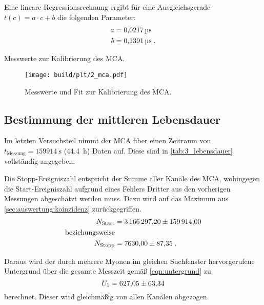Eine lineare Regressionsrechnung ergibt
für eine Ausgleichsgerade $t(c) = a \cdot c + b$
die folgenden Parameter:
\begin{align*}
    a &=\SI{0.0217 \pm 0}{\micro\second} \\
    b &=\SI{0.1391 \pm 0}{\micro\second} \; .
\end{align*}

\begin{table}
    \centering
    \caption{Messwerte zur Kalibrierung des \ac{MCA}.}
    \label{tab:2_mca}
\end{table}

\begin{figure}
    \centering
    \texttt{[image: build/plt/2\_mca.pdf]}
    \caption{Messwerte und Fit zur Kalibrierung des \ac{MCA}.}
    \label{fig:plt:2_mca}
\end{figure}


\FloatBarrier
\subsection{Bestimmung der mittleren Lebensdauer} \label{sec:auswertung:lebensdauer}
Im letzten Versuchsteil nimmt der \ac{MCA} über einen Zeitraum von $t_\text{Messung} = \SI{159914}{\second}$ (\SI{44.4}{\hour}) Daten auf.
Diese sind in \autoref{tab:3_lebensdauer} vollständig angegeben.


Die Stopp-Ereigniszahl entspricht der Summe aller Kanäle des \ac{MCA},
wohingegen die Start-Ereigniszahl aufgrund eines Fehlers Dritter aus den vorherigen Messungen abgeschätzt werden muss.
Dazu wird auf das Maximum aus \autoref{sec:auswertung:koinzidenz} zurückgegriffen.
\begin{align*}
    N_\text{Start} &= \num{3166297.20 \pm 159914.00} \\
    \text{beziehungsweise} \\
    N_\text{Stopp} &= \num{7630.00 \pm 87.35} \; .
\end{align*}

Daraus wird der durch mehrere Myonen im gleichen Suchfenster hervorgerufene Untergrund über die gesamte Messzeit
gemäß \autoref{eqn:untergrund} zu
\[
    U_1 = \num{627.05 \pm 63.34}
\]
berechnet.
Dieser wird gleichmäßig von allen Kanälen abgezogen.

